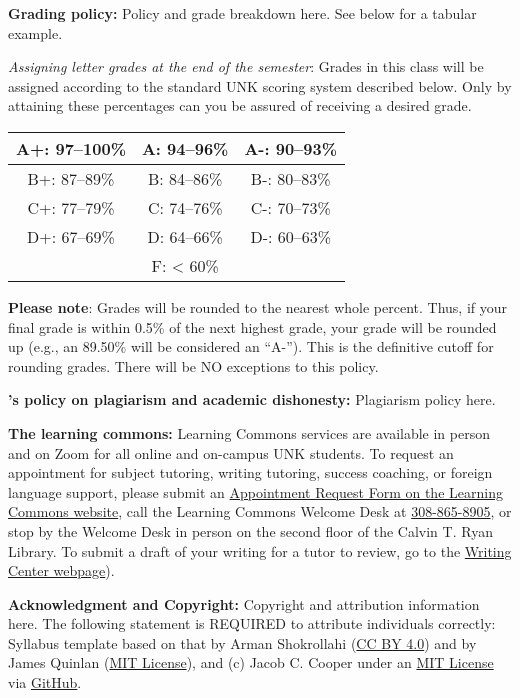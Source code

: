 \documentclass[11pt]{article}
\begin{document}
	\skippers
	\noindent\textbf{Grading policy:} Policy and grade breakdown here. See below for a tabular example.
	
	\vskip0.025in
	\noindent\textit{Assigning letter grades at the end of the semester}: Grades in this class will be assigned according to the standard UNK scoring system described below. Only by attaining these percentages can you be assured of receiving a desired grade. 
	
	\begin{center}
		\begin{tabular}{| c | c | c |}
			\hline
			A+: 97--100\% & A: 94--96\% & A-: 90--93\%  \\
			\hline
			B+: 87--89\% & B: 84--86\% & B-: 80--83\%  \\
			\hline
			C+: 77--79\% & C: 74--76\% & C-: 70--73\%  \\
			\hline
			D+: 67--69\% & D: 64--66\% & D-: 60--63\%  \\
			\hline
			 & F: < 60\% & \\
			 \hline
		\end{tabular}
	\end{center}
	
	\vskip0.025in
	\noindent\textbf{Please note}: Grades will be rounded to the nearest whole percent. Thus, if your final grade is within 0.5\% of the next highest grade, your grade will be rounded up (e.g., an 89.50\% will be considered an “A-”). This is the definitive cutoff for rounding grades. There will be NO exceptions to this policy. 
	
	\skippers
	\noindent\textbf{\shortname's policy on plagiarism and academic dishonesty:} Plagiarism policy here.
	
	\skippers
	\noindent\textbf{The learning commons:} Learning Commons services are available in person and on Zoom for all online and on-campus UNK students. To request an appointment for subject tutoring, writing tutoring, success coaching, or foreign language support, please submit an \href{https://www.unk.edu/offices/learning_commons/index.php}{Appointment Request Form on the Learning Commons website}, call the Learning Commons Welcome Desk at \href{tel:13088658905}{308-865-8905}, or stop by the Welcome Desk in person on the second floor of the Calvin T. Ryan Library. To submit a draft of your writing for a tutor to review, go to the \href{https://www.unk.edu/offices/learning_commons/writing-center.php}{Writing Center webpage}).
	
	\skippers
	\noindent\textbf{Acknowledgment and Copyright:} Copyright and attribution information here. The following statement is REQUIRED to attribute individuals correctly: Syllabus template based on that by Arman Shokrollahi (\href{https://creativecommons.org/licenses/by/4.0/deed.en}{CC BY 4.0}) and by James Quinlan (\href{https://github.com/aws/mit-0}{MIT License}), and (c) Jacob C. Cooper under an \href{https://github.com/aws/mit-0}{MIT License} via \href{https://github.com/jacobccooper/syllabus_template_UNK/tree/main}{GitHub}.
\end{document}
